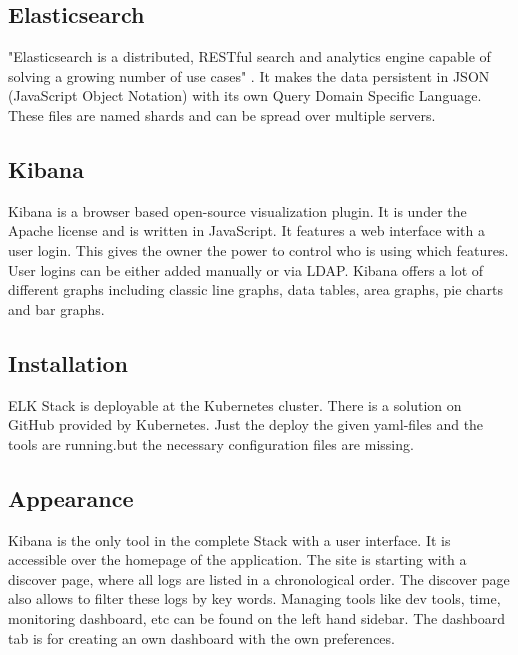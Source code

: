 \subsection{Elasticsearch}
\label{Elasticsearch}
"Elasticsearch is a distributed, RESTful search and analytics engine capable of solving a growing number of use cases" \cite{elasticsearch}. It makes the data persistent in JSON (JavaScript Object Notation) with its own Query Domain Specific Language. These files are named shards and can be spread over multiple servers.
\subsection{Kibana}
Kibana is a browser based open-source visualization plugin. It is under the Apache license and is written in JavaScript. It features a web interface with a user login. This gives the owner the power to control who is using which features. User logins can be either added manually or via LDAP.
Kibana offers a lot of different graphs including classic line graphs, data tables, area graphs, pie charts and bar graphs.
\subsection{Installation}
ELK Stack is deployable at the Kubernetes cluster. There is a solution on GitHub provided by Kubernetes. Just the deploy the given yaml-files and the tools are running.but the necessary configuration files are missing.
\subsection{Appearance}%
Kibana is the only tool in the complete Stack with a user interface. It is accessible over the homepage of the application. The site is starting with a discover page, where all logs are listed in a chronological order. The discover page also allows to filter these logs by key words. Managing tools like dev tools, time, monitoring dashboard, etc can be found on the left hand sidebar. The dashboard tab is for creating an own dashboard with the own preferences.
